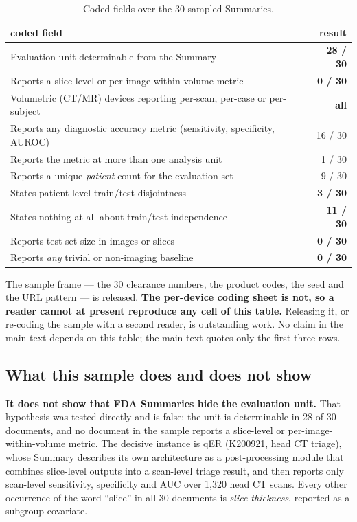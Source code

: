 \documentclass[11pt,a4paper]{article}
\begin{document}
\begin{table}[htbp]
\centering
\caption{Coded fields over the 30 sampled Summaries.}
\small
\begin{tabular}{@{}L{10.4cm}r@{}}
\toprule
coded field & result \\
\midrule
Evaluation unit determinable from the Summary & \textbf{28 / 30} \\
Reports a slice-level or per-image-within-volume metric & \textbf{0 / 30} \\
Volumetric (CT/MR) devices reporting per-scan, per-case or per-subject & \textbf{all} \\
Reports any diagnostic accuracy metric (sensitivity, specificity, AUROC) & 16 / 30 \\
Reports the metric at more than one analysis unit & 1 / 30 \\
Reports a unique \emph{patient} count for the evaluation set & 9 / 30 \\
States patient-level train/test disjointness & \textbf{3 / 30} \\
States nothing at all about train/test independence & \textbf{11 / 30} \\
Reports test-set size in images or slices & \textbf{0 / 30} \\
Reports \emph{any} trivial or non-imaging baseline & \textbf{0 / 30} \\
\bottomrule
\end{tabular}

\vspace{2mm}
\footnotesize\raggedright
The sample frame --- the 30 clearance numbers, the product codes, the seed and the URL
pattern --- is released. \textbf{The per-device coding sheet is not, so a reader cannot
at present reproduce any cell of this table.} Releasing it, or re-coding the sample with
a second reader, is outstanding work. No claim in the main text depends on this table;
the main text quotes only the first three rows.
\end{table}

\subsection{What this sample does and does not show}

\textbf{It does not show that FDA Summaries hide the evaluation unit.} That hypothesis
was tested directly and is false: the unit is determinable in 28 of 30 documents, and
no document in the sample reports a slice-level or per-image-within-volume metric. The
decisive instance is qER (K200921, head CT triage), whose Summary describes its own
architecture as a post-processing module that combines slice-level outputs into a
scan-level triage result, and then reports only scan-level sensitivity, specificity
and AUC over 1{,}320 head CT scans. Every other occurrence of the word ``slice'' in
all 30 documents is \emph{slice thickness}, reported as a subgroup covariate.
\end{document}

